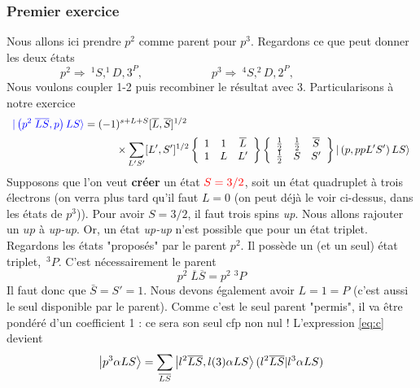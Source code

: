 \subsubsection{Premier exercice}
Nous allons ici prendre $p^2$ comme parent pour $p^3$. Regardons ce que peut donner les 
deux états
\begin{equation}
p^2 \Rightarrow\ ^1S, ^1D, 3^P,\qquad\qquad\qquad
p^3 \Rightarrow\ ^4S, ^2D, 2^P,\qquad\qquad\qquad
\end{equation}
Nous voulons coupler 1-2 puis recombiner le résultat avec 3. Particularisons à notre exercice
\begin{equation}
\begin{array}{l}
\DS  {\color{blue}
\vert \left( p^{2} \; \overline{L} \overline{S}, p \right) L S 
\rangle  }
= (-1)^{s +L  +S} [ \overline{L} , \overline{S} ]^{1/2}\vspace{2mm}\\
\qquad\qquad\qquad\qquad\qquad\DS \times  \sum_{L' S'} [ L', S' ]^{1/2} 
\left\{ 
\begin{array}{ccc}
1 & 1 & \overline{L} \\
1 & L & L'
\end{array}
\right\}
\left\{ 
\begin{array}{ccc}
\frac{1}{2} & \frac{1}{2} & \overline{S} \\
\frac{1}{2} & S & S'
\end{array}
\right\}
\vert \left( p, pp  L' S' \right) L S \rangle
\end{array}
\end{equation}
Supposons que l'on veut \textbf{créer} un état ${\color{red} S=3/2}$, soit un état quadruplet
à trois électrons (on verra plus tard qu'il faut $L=0$ (on peut déjà le voir ci-dessus, dans les
états de $p^3$)). Pour avoir $S=3/2$, il faut trois spins \textit{up}. Nous allons rajouter un
$up$ à \textit{up-up}. Or, un état \textit{up-up} n'est possible que pour un état triplet. Regardons
les états "proposés" par le parent $p^2$. Il possède un (et un seul) état triplet,\ $^3P$. C'est
nécessairement le parent
\begin{equation}
 p^{2} \; \overline{L} \overline{S} = p^2 \; ^3P
\end{equation}
Il faut donc que $\bar S = S' = 1$. Nous devons également avoir $L=1=P$ (c'est aussi le
seul disponible par le parent). Comme c'est le seul parent "permis", il va être pondéré d'un 
coefficient 1 : ce sera son seul cfp non nul ! L'expression \eqref{eq:c} devient
\begin{equation}
\ket{p^3\alpha LS} = \sum_{\overline{LS}} \ket{l^2\overline{LS},l(3)\alpha LS}(l^2\overline{LS}|
l^3\alpha LS)
\end{equation}
